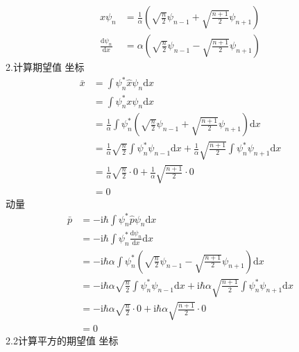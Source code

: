 \begin{equation}
    \begin{aligned}
        x\psi _n&=\frac{1}{\alpha}\left( \sqrt{\frac{n}{2}}\psi _{n-1}+\sqrt{\frac{n+1}{2}}\psi _{n+1} \right) 
\\
\frac{\mathrm{d}\psi _n}{\mathrm{d}x}&=\alpha \left( \sqrt{\frac{n}{2}}\psi _{n-1}-\sqrt{\frac{n+1}{2}}\psi _{n+1} \right) 
    \end{aligned}
\end{equation}
2.计算期望值
坐标
\begin{equation}
    \begin{aligned}
        \bar{x}&=\int{\psi _{n}^{*}\hat{x}\psi _n\mathrm{d}x}
\\
&=\int{\psi _{n}^{*}x\psi _n\mathrm{d}x}
\\
&=\frac{1}{\alpha}\int{\psi _{n}^{*}\left( \sqrt{\frac{n}{2}}\psi _{n-1}+\sqrt{\frac{n+1}{2}}\psi _{n+1} \right) \mathrm{d}x}
\\
&=\frac{1}{\alpha}\sqrt{\frac{n}{2}}\int{\psi _{n}^{*}\psi _{n-1}\mathrm{d}x}+\frac{1}{\alpha}\sqrt{\frac{n+1}{2}}\int{\psi _{n}^{*}\psi _{n+1}\mathrm{d}x}
\\
&=\frac{1}{\alpha}\sqrt{\frac{n}{2}}\cdot 0+\frac{1}{\alpha}\sqrt{\frac{n+1}{2}}\cdot 0
\\
&=0
    \end{aligned}
\end{equation}
动量
\begin{equation}
    \begin{aligned}
        \bar{p}&=-\mathrm{i}\hbar \int{\psi _{n}^{*}\hat{p}\psi _n\mathrm{d}x}
\\
&=-\mathrm{i}\hbar \int{\psi _{n}^{*}\frac{\mathrm{d}\psi _n}{\mathrm{d}x}\mathrm{d}x}
\\
&=-\mathrm{i}\hbar \alpha \int{\psi _{n}^{*}\left( \sqrt{\frac{n}{2}}\psi _{n-1}-\sqrt{\frac{n+1}{2}}\psi _{n+1} \right) \mathrm{d}x}
\\
&=-\mathrm{i}\hbar \alpha \sqrt{\frac{n}{2}}\int{\psi _{n}^{*}\psi _{n-1}\mathrm{d}x}+\mathrm{i}\hbar \alpha \sqrt{\frac{n+1}{2}}\int{\psi _{n}^{*}\psi _{n+1}\mathrm{d}x}
\\
&=-\mathrm{i}\hbar \alpha \sqrt{\frac{n}{2}}\cdot 0+\mathrm{i}\hbar \alpha \sqrt{\frac{n+1}{2}}\cdot 0
\\
&=0
    \end{aligned}
\end{equation}
2.2计算平方的期望值
坐标

